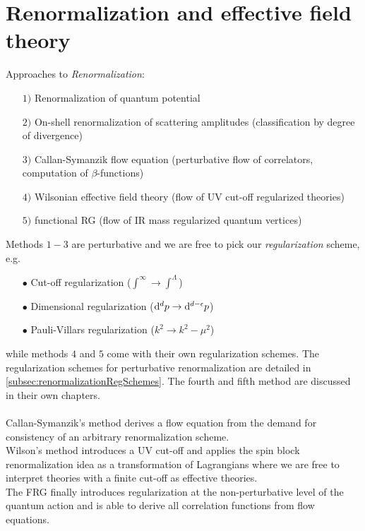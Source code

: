 \newpage


\section{Renormalization and effective field theory}
\label{sec:renormalization}
Approaches to \emph{Renormalization}:
\begin{enumerate}
	\item[$1)$] Renormalization of quantum potential
	\item[$2)$] On-shell renormalization of scattering amplitudes (classification by degree of divergence)
	\item[$3)$] Callan-Symanzik flow equation (perturbative flow of correlators, computation of $\beta$-functions)
	\item[$4)$] Wilsonian effective field theory (flow of UV cut-off regularized theories)
	\item[$5)$]functional RG (flow of IR mass regularized quantum vertices)
\end{enumerate}
Methods $1-3$ are perturbative and we are free to pick our \emph{regularization} scheme, e.g.
\begin{enumerate}
\item[$\bullet$] Cut-off regularization ($\int^\infty \rightarrow \int^\Lambda$)
\item[$\bullet$] Dimensional regularization ($\mathrm{d}^d p \rightarrow \mathrm{d}^{d-\epsilon} p$)
\item[$\bullet$] Pauli-Villars regularization ($k^2\rightarrow k^2-\mu^2$)
\end{enumerate}
while methods $4$ and $5$ come with their own regularization schemes. The regularization schemes for perturbative renormalization are detailed in \ref{subsec:renormalizationRegSchemes}. The fourth and fifth method are discussed in their own chapters.\\
\\
Callan-Symanzik's method derives a flow equation from the demand for consistency of an arbitrary renormalization scheme.\\
Wilson's method introduces a UV cut-off and applies the spin block renormalization idea as a transformation of Lagrangians where we are free to interpret theories with a finite cut-off as effective theories.\\
The FRG finally introduces regularization at the non-perturbative level of the quantum action and is able to derive all correlation functions from flow equations.\\
\\
